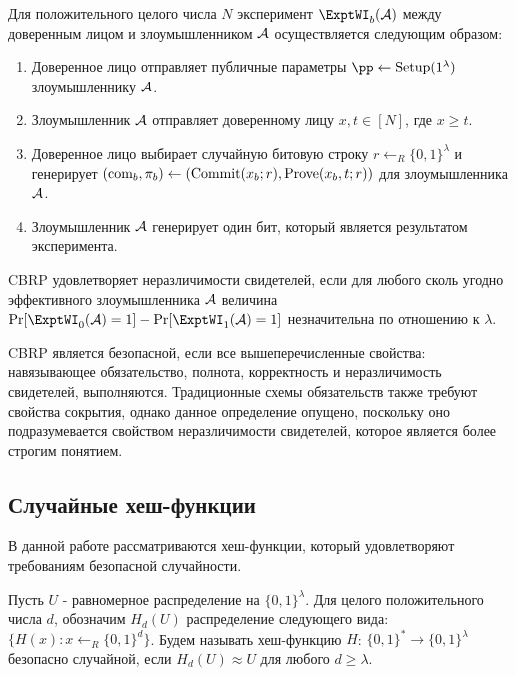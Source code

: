 \begin{definition}[$\ExptWI$]
	Для положительного целого числа $N$ эксперимент $\ExptWI_b(\A)$ между доверенным лицом и злоумышленником $\mathcal{A}$ осуществляется следующим образом:
	\begin{enumerate}
		\item Доверенное лицо отправляет публичные параметры $\pp \leftarrow \Setup(1^\lambda)$ злоумышленнику $\mathcal{A}$.
		\item Злоумышленник $\mathcal{A}$ отправляет доверенному лицу $x, t \in [N]$, где $x \geq t$.
		\item Доверенное лицо выбирает случайную битовую строку $r \leftarrow_R \{0, 1\}^\lambda$ и генерирует $(\text{com}_b, \pi_b) \leftarrow (\text{Commit}(x_b; r), \text{Prove}(x_b, t; r))$ для злоумышленника $\mathcal{A}$.
		\item Злоумышленник $\mathcal{A}$ генерирует один бит, который является результатом эксперимента.
	\end{enumerate}
\end{definition}

\begin{definition}
	CBRP удовлетворяет неразличимости свидетелей, если для любого сколь угодно эффективного злоумышленника $\mathcal{A}$ величина $\Pr[\ExptWI_0(\A) = 1] - \Pr[\ExptWI_1(\A)=1]$ незначительна по отношению к $\lambda$.
\end{definition}

CBRP является безопасной, если все вышеперечисленные свойства: навязывающее обязательство, полнота, корректность и неразличимость свидетелей, выполняются.
Традиционные схемы обязательств также требуют свойства сокрытия, однако данное определение опущено, поскольку оно подразумевается свойством неразличимости свидетелей, которое является более строгим понятием.

\subsection{Случайные хеш-функции} %
В данной работе рассматриваются хеш-функции, который удовлетворяют требованиям безопасной случайности.

\begin{definition}
	Пусть $U$ - равномерное распределение на $\{0, 1\}^\lambda$.
	Для целого положительного числа $d$, обозначим $H_d(U)$ распределение следующего вида: $\{H(x): x \leftarrow_R \{0, 1\}^d\}$.
	Будем называть хеш-функцию $H$: $\{0, 1\}^* \rightarrow \{0, 1\}^\lambda$ безопасно случайной, если $H_d(U) \approx U$ для любого $d \geq \lambda$.
\end{definition}


